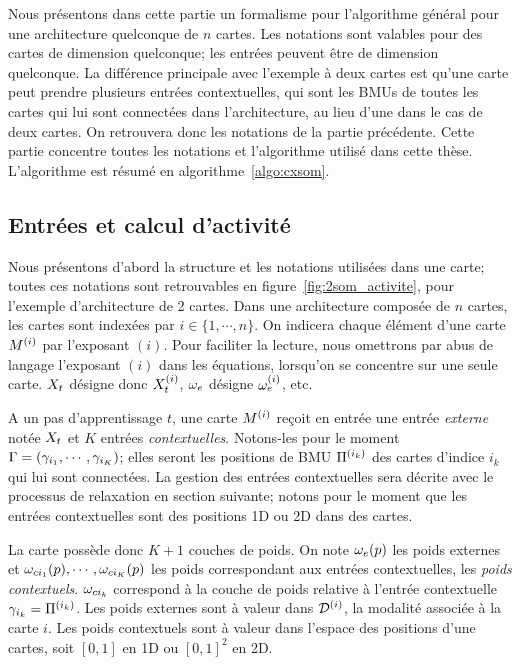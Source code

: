 \documentclass[../main]{subfiles}
\begin{document}
Nous présentons dans cette partie un formalisme pour l'algorithme général pour une architecture quelconque de $n$ cartes. Les notations sont valables pour des cartes de dimension quelconque; les entrées peuvent être de dimension quelconque.
La différence principale avec l'exemple à deux cartes est qu'une carte peut prendre plusieurs entrées contextuelles, qui sont les BMUs de toutes les cartes qui lui sont connectées dans l'architecture, au lieu d'une dans le cas de deux cartes. On retrouvera donc les notations de la partie précédente.
Cette partie concentre toutes les notations et l'algorithme utilisé dans cette thèse. L'algorithme est résumé en algorithme~\ref{algo:cxsom}.

\subsection{Entrées et calcul d'activité}

Nous présentons d'abord la structure et les notations utilisées dans une carte; toutes ces notations sont retrouvables en figure~\ref{fig:2som_activite}, pour l'exemple d'architecture de 2 cartes. Dans une architecture composée de $n$ cartes, les cartes sont indexées par $i \in \{1,\cdots,n\}$. On indicera chaque élément d'une carte $M^{({i})}$ par l'exposant $(i)$.
Pour faciliter la lecture, nous omettrons par abus de langage l'exposant $(i)$ dans les équations, lorsqu'on se concentre sur une seule carte. $X_t$ désigne donc $X_t^{({i})}$, $\omega_e$ désigne $\omega_e^{({i})}$, etc.


A un pas d'apprentissage $t$, une carte $M^{({i})}$ reçoit en entrée une entrée \emph{externe} notée $X_t$ et $K$ entrées \emph{contextuelles}. Notons-les pour le moment $\Gamma = (\gamma_{i_1},\cdots,\gamma_{i_K})$; elles seront les positions de BMU $\Pi^{({i_k})}$ des cartes d'indice $i_k$ qui lui sont connectées. La gestion des entrées contextuelles sera décrite avec le processus de relaxation en section suivante; notons pour le moment que les entrées contextuelles sont des positions 1D ou 2D dans des cartes. 

La carte possède donc $K+1$ couches de poids. On  note $\omega_e(p)$ les poids externes et $\omega_{ci_1}(p), \cdots, \omega_{ci_K}(p)$ les poids correspondant aux entrées contextuelles, les \emph{poids contextuels}.
$\omega_{ci_k}$ correspond à la couche de poids relative à l'entrée contextuelle $\gamma_{i_k} = \Pi^{({i_k})}$. Les poids externes sont à valeur dans $\mathcal{D}^{({i})}$, la modalité associée à la carte $i$. Les poids contextuels sont à valeur dans l'espace des positions d'une cartes, soit $[0,1]$ en 1D ou $[0,1]^2$ en 2D.
\end{document}
